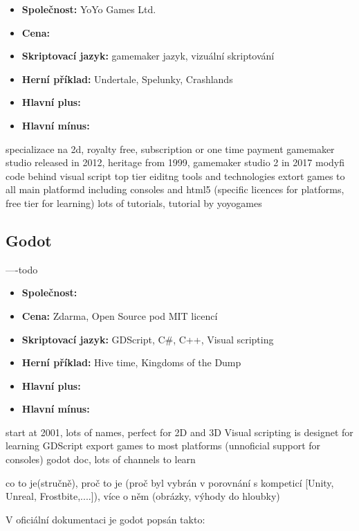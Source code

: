 \begin{itemize}
	\item \textbf{Společnost: } YoYo Games Ltd.
	\item \textbf{Cena: }
	\item \textbf{Skriptovací jazyk: } gamemaker jazyk, vizuální skriptování
	\item \textbf{Herní příklad: } Undertale, Spelunky, Crashlands
	\item \textbf{Hlavní plus: }
	\item \textbf{Hlavní mínus: }
\end{itemize}

specializace na 2d, royalty free, subscription or one time payment
gamemaker studio released in 2012, heritage from 1999, gamemaker studio 2 in 2017
modyfi code behind visual script
top tier eiditng tools and technologies
extort games to all main platformd including consoles and html5 (specific licences for platforms, free tier for learning)
lots of tutorials, tutorial by yoyogames

\subsection{Godot}
----todo \linebreak
{}

\begin{itemize}
	\item \textbf{Společnost: }
	\item \textbf{Cena: } Zdarma,  Open Source pod MIT licencí
	\item \textbf{Skriptovací jazyk: } GDScript, C\#, C++, Visual scripting
	\item \textbf{Herní příklad: } Hive time, Kingdoms of the Dump
	\item \textbf{Hlavní plus: }
	\item \textbf{Hlavní mínus: }
\end{itemize}

start at 2001, lots of names, perfect for 2D and 3D
Visual scripting is designet for learning GDScript
export games to most platforms (unnoficial support for consoles)
godot doc, lots of channels to learn


co to je(stručně), proč to je (proč byl vybrán  v porovnání s kompeticí [Unity, Unreal, Frostbite,....]), více o  něm (obrázky, výhody do hloubky)

V oficiální dokumentaci je godot popsán takto:


